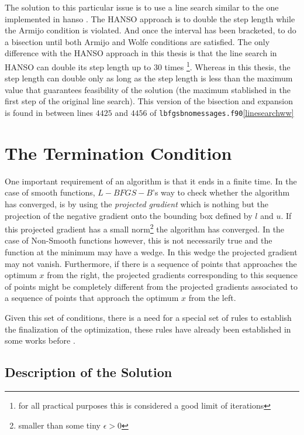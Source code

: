 The solution to this particular issue is to use a line search similar to the one implemented in hanso \citep{hanso}. The HANSO approach is to double the step length while the Armijo condition is violated. And once the interval has been bracketed, to do a bisection until both Armijo and Wolfe conditions are satisfied. The only difference with the HANSO approach in this thesis is that the line search in HANSO can double its step length up to $30$ times \footnote{for all practical purposes this is considered a good limit of iterations}. Whereas in this thesis, the step length can double only as long as the step length is less than the maximum value that guarantees feasibility of the solution (the maximum stablished in the first step of the original line search). This version of the bisection and expansion is found in between lines $4425$ and $4456$ of \texttt{lbfgsbnomessages.f90}\ref{linesearchww} 

\section{The Termination Condition} \label{terminator}

One important requirement of an algorithm is that it ends in a finite time. In the case of smooth functions, $L-BFGS-B$'s way to check whether the algorithm has converged, is by using the \emph{projected gradient} which is nothing but the projection of the negative gradient onto the bounding box defined by $l$ and $u$. If this projected gradient has a small norm\footnote{smaller than some tiny $\epsilon > 0$} the algorithm has converged. In the case of Non-Smooth functions however, this is not necessarily true and the function at the minimum may have a wedge. In this wedge the projected gradient may not vanish. Furthermore, if there is a sequence of points that approaches the optimum $x$ from the right, the projected gradients corresponding to this sequence of points might be completely different from the projected gradients associated to a sequence of points that approach the optimum $x$ from the left.

Given this set of conditions, there is a need for a special set of rules to establish the finalization of the optimization, these rules have already been established in some works before\citep{overtonlewis} \citep{skajaa}.

\subsection{Description of the Solution}

